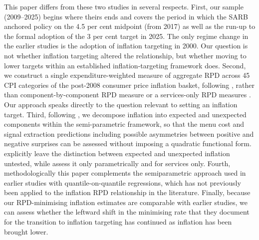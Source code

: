 \documentclass[
  letterpaper,
  DIV=11,
  numbers=noendperiod]{scrartcl}
\begin{document}
This paper differs from these two studies in several respects. First,
our sample (2009--2025) begins where theirs ends and covers the period
in which the SARB anchored policy on the 4.5 per cent midpoint (from
2017) as well as the run-up to the formal adoption of the 3 per cent
target in 2025. The only regime change in the earlier studies is the
adoption of inflation targeting in 2000. Our question is not whether
inflation targeting altered the relationship, but whether moving to
lower targets within an established inflation-targeting framework does.
Second, we construct a single expenditure-weighted measure of aggregate
RPD across 45 CPI categories of the post-2008 consumer price inflation
basket, following \citet{lach1992}, rather than component-by-component
RPD measure \citep{ndou2014} or a services-only RPD measures
\citep{ndou2017}. Our approach speaks directly to the question relevant
to setting an inflation target. Third, following \citet{caraballo2013},
we decompose inflation into expected and unexpected components within
the semi-parametric framework, so that the menu cost and signal
extraction predictions including possible asymmetries between positive
and negative surprises can be assessed without imposing a quadratic
functional form. \citet{ndou2014} explicitly leave the distinction
between expected and unexpected inflation untested, while
\citet{ndou2017} assess it only parametrically and for services only.
Fourth, methodologically this paper complements the semiparametric
approach used in earlier studies with quantile-on-quantile regressions,
which has not previously been applied to the inflation RPD relationship
in the literature. Finally, because our RPD-minimising inflation
estimates are comparable with earlier studies, we can assess whether the
leftward shift in the minimising rate that they document for the
transition to inflation targeting has continued as inflation has been
brought lower.
\end{document}
